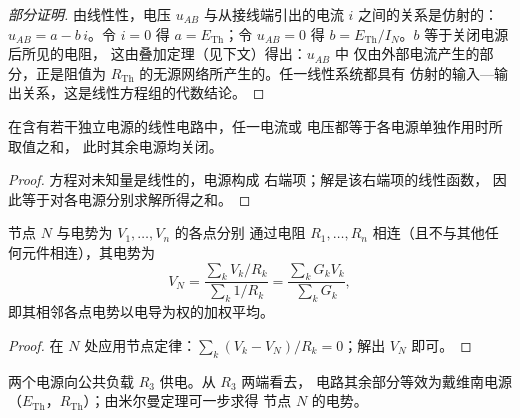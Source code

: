 \begin{proof}[部分证明]
由线性性，电压 $u_{AB}$ 与从接线端引出的电流
$i$ 之间的关系是仿射的：$u_{AB} = a - b\,i$。令
$i = 0$ 得 $a = E_{\mathrm{Th}}$；令 $u_{AB} = 0$ 得
$b = E_{\mathrm{Th}}/I_N$。$b$ 等于关闭电源后所见的电阻，
这由叠加定理（见下文）得出：$u_{AB}$ 中
仅由外部电流产生的部分，正是阻值为
$R_{\mathrm{Th}}$ 的无源网络所产生的。任一线性系统都具有
仿射的输入—输出关系，这是线性方程组的代数结论。
\end{proof}

\begin{theorem}[叠加定理]\label{thm:b1:dc-circuits:superposition}
在含有若干独立电源的线性电路中，任一电流或
电压都等于各电源单独作用时所取值之和，
此时其余电源均关闭。
\end{theorem}

\begin{proof}
方程对未知量是线性的，电源构成
右端项；解是该右端项的线性函数，
因此等于对各电源分别求解所得之和。
\end{proof}

\begin{proposition}[米尔曼定理]\label{prop:b1:dc-circuits:millman}
节点 $N$ 与电势为 $V_1, \dots, V_n$ 的各点分别
通过电阻 $R_1, \dots, R_n$ 相连（且不与其他任何元件相连），其电势为
\[
V_N = \frac{\sum_k V_k/R_k}{\sum_k 1/R_k} = \frac{\sum_k G_k V_k}{\sum_k G_k},
\]
即其相邻各点电势以电导为权的加权平均。
\end{proposition}

\begin{proof}
在 $N$ 处应用节点定律：$\sum_k (V_k - V_N)/R_k = 0$；解出 $V_N$ 即可。
\end{proof}

\begin{omfigure}

{\small 两个电源向公共负载 $R_3$ 供电。从 $R_3$ 两端看去，
电路其余部分等效为戴维南电源
（$E_{\mathrm{Th}}$，$R_{\mathrm{Th}}$）；由米尔曼定理可一步求得
节点 $N$ 的电势。}
\end{omfigure}

